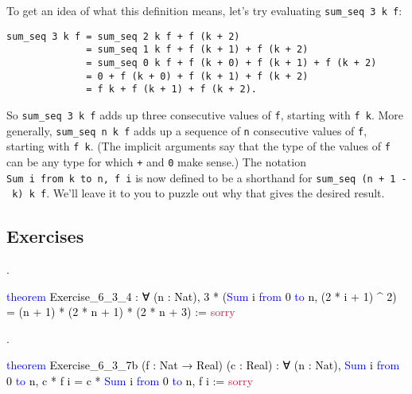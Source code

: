 \documentclass[
  letterpaper,
  DIV=11,
  numbers=noendperiod]{scrreprt}
\newenvironment{Shaded}{\begin{snugshade}}{\end{snugshade}}
\newcommand{\ConstantTok}[1]{\textcolor[rgb]{0.56,0.35,0.01}{#1}}
\newcommand{\KeywordTok}[1]{\textcolor[rgb]{0.00,0.23,0.31}{#1}}
\newcommand{\NormalTok}[1]{\textcolor[rgb]{0.00,0.23,0.31}{#1}}
\renewcommand{\NormalTok}[1]{\textcolor[HTML]{000000}{#1}}
\renewcommand{\KeywordTok}[1]{\textcolor[HTML]{0000FF}{#1}}
\renewcommand{\ConstantTok}[1]{\textcolor[HTML]{DC143C}{#1}}
\newenvironment{ind}
	{\begin{list}{}{\setlength{\leftmargin}{1em}}\item\relax}
	{\end{list}}
\newcommand{\nobreakShaded}{\renewenvironment{Shaded}
	{\begin{tcolorbox}[frame hidden, enhanced, interior hidden, boxrule=0pt,
		borderline west={3pt}{0pt}{shadecolor}, sharp corners]}
	{\end{tcolorbox}}}
\newenvironment{numex}[1]
	{\begin{minipage}[t]{0.04\textwidth}\vspace{8pt}{#1}.
		\end{minipage}\nobreakShaded\begin{minipage}[t]{0.96\textwidth}\vspace{0pt}}
	{\end{minipage}}
\theoremstyle{remark}
\begin{document}
To get an idea of what this definition means, let's try evaluating
\texttt{sum\_seq\ 3\ k\ f}:

\begin{ind}

\begin{verbatim}
sum_seq 3 k f = sum_seq 2 k f + f (k + 2)
              = sum_seq 1 k f + f (k + 1) + f (k + 2)
              = sum_seq 0 k f + f (k + 0) + f (k + 1) + f (k + 2)
              = 0 + f (k + 0) + f (k + 1) + f (k + 2)
              = f k + f (k + 1) + f (k + 2).
\end{verbatim}

\end{ind}

So \texttt{sum\_seq\ 3\ k\ f} adds up three consecutive values of
\texttt{f}, starting with \texttt{f\ k}. More generally,
\texttt{sum\_seq\ n\ k\ f} adds up a sequence of \texttt{n} consecutive
values of \texttt{f}, starting with \texttt{f\ k}. (The implicit
arguments say that the type of the values of \texttt{f} can be any type
for which \texttt{+} and \texttt{0} make sense.) The notation
\texttt{Sum\ i\ from\ k\ to\ n,\ f\ i} is now defined to be a shorthand
for \texttt{sum\_seq\ (n\ +\ 1\ -\ k)\ k\ f}. We'll leave it to you to
puzzle out why that gives the desired result.

\hypertarget{exercises-16}{%
\subsection{Exercises}\label{exercises-16}}

\begin{numex}{1}

\begin{Shaded}
\begin{Highlighting}[]
\KeywordTok{theorem}\NormalTok{ Exercise\_6\_3\_4 : ∀ (n : Nat),}
\NormalTok{    3 * (}\KeywordTok{Sum}\NormalTok{ i }\KeywordTok{from}\NormalTok{ 0 }\KeywordTok{to}\NormalTok{ n, (2 * i + 1) \^{} 2) =}
\NormalTok{    (n + 1) * (2 * n + 1) * (2 * n + 3) := }\ConstantTok{sorry}
\end{Highlighting}
\end{Shaded}

\end{numex}

\begin{numex}{2}

\begin{Shaded}
\begin{Highlighting}[]
\KeywordTok{theorem}\NormalTok{ Exercise\_6\_3\_7b (f : Nat → Real) (c : Real) : ∀ (n : Nat),}
    \KeywordTok{Sum}\NormalTok{ i }\KeywordTok{from}\NormalTok{ 0 }\KeywordTok{to}\NormalTok{ n, c * f i = c * }\KeywordTok{Sum}\NormalTok{ i }\KeywordTok{from}\NormalTok{ 0 }\KeywordTok{to}\NormalTok{ n, f i := }\ConstantTok{sorry}
\end{Highlighting}
\end{Shaded}

\end{numex}
\end{document}
